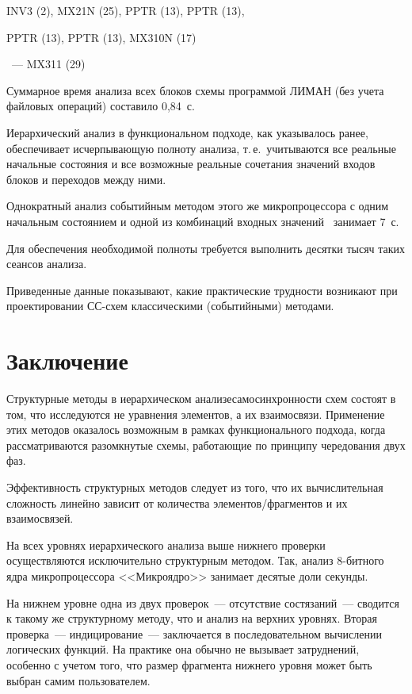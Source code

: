 \begin{multicols}{2}
  \hspace*{4mm}INV3 (2), MX21N (25), PPTR (13), PPTR (13),

  \hspace*{4mm}PPTR (13), PPTR (13), MX310N (17)

  ~--- MX311 (29)

  Суммарное время анализа всех блоков схемы программой ЛИМАН (без учета
файловых операций) составило 0,84~с.

  Иерархический анализ в функциональном подходе, как указывалось ранее,
обеспечивает исчерпывающую полноту анализа, т.\,е.\ учитываются все
реальные начальные состояния и все возможные реальные сочетания значений
входов блоков и переходов между ними.

  Однократный анализ событийным методом этого же микропроцессора с
одним начальным со\-сто\-яни\-ем и одной из комбинаций входных
значений~\cite{12-p} занимает 7~с.

  Для обеспечения необходимой полноты требуется выполнить десятки тысяч
таких сеансов анализа.

  Приведенные данные показывают, какие практические трудности возникают
при проектировании СС-схем классическими (событийными) методами.

\vspace*{-4pt}

\section{Заключение}

\vspace*{-2pt}

  Структурные методы в иерархическом анализе\linebreak самосинхронности схем
состоят в том, что исследуются не уравнения элементов, а их взаимосвязи.
Применение этих методов оказалось возможным в рамках функционального
подхода, когда рассматрива\-ются разомкнутые схемы, работающие по принципу
чередования двух фаз.

  Эффективность структурных методов следует из того, что их вычислительная
сложность линейно зависит от количества элементов/фрагментов и их
взаимосвязей.

  На всех уровнях иерархического анализа выше нижнего проверки
осуществляются исключительно структурным методом. Так, анализ
  8-бит\-но\-го ядра микропроцессора <<Микроядро>> занимает десятые доли
секунды.

  На нижнем уровне одна из двух проверок~--- отсутствие состязаний~---
сводится к такому же структурному методу, что и анализ на верхних уровнях.
Вторая проверка~--- индицирование~--- заключается в последовательном
вычислении логических функций. На практике она обычно не вызывает
затруднений, особенно с учетом того, что размер фрагмента нижнего уровня
может быть выбран самим пользователем.


\end{multicols}
